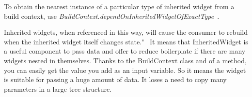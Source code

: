 To obtain the nearest instance of a particular type of inherited widget from a build context, use \textit{BuildContext.dependOnInheritedWidgetOfExactType}~\cite{dependOnInheritedWidgetOfExactType}.

Inherited widgets, when referenced in this way, will cause the consumer to rebuild when the inherited widget itself changes state."~\cite{inheritedWidget}
It means that InheritedWidget is a useful component to pass data and offer to reduce boilerplate if there are many widgets nested in themselves.
Thanks to the BuildContext class and of a method, you can easily get the value you add as an input variable.
So it means the widget is suitable for passing a huge amount of data.
It loses a need to copy many parameters in a large tree structure.
